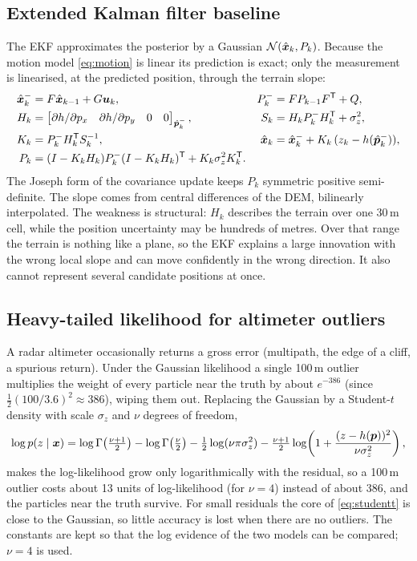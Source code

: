 \subsection{Extended Kalman filter baseline}\label{sec:ekf}
The EKF approximates the posterior by a Gaussian $\mathcal{N}(\hat{\bm{x}}_k, P_k)$. Because the motion model
\eqref{eq:motion} is linear its prediction is exact; only the measurement is linearised, at the
predicted position, through the terrain slope:
\begin{align}
  \hat{\bm{x}}_k^- &= F\hat{\bm{x}}_{k-1} + G\bm{u}_k, & P_k^- &= F P_{k-1} F^{\mathsf{T}} + Q,\\
  H_k &= \begin{bmatrix} \partial h/\partial p_x & \partial h/\partial p_y & 0 & 0\end{bmatrix}_{\hat{\bm{p}}_k^-},
  & S_k &= H_k P_k^- H_k^{\mathsf{T}} + \sigma_z^2,\\
  K_k &= P_k^- H_k^{\mathsf{T}} S_k^{-1}, & \hat{\bm{x}}_k &= \hat{\bm{x}}_k^- + K_k\,(z_k - h(\hat{\bm{p}}_k^-)),\\
  P_k &= (I - K_k H_k) P_k^- (I - K_k H_k)^{\mathsf{T}} + K_k \sigma_z^2 K_k^{\mathsf{T}}. &&
\end{align}
The Joseph form of the covariance update keeps $P_k$ symmetric positive semi-definite. The
slope comes from central differences of the DEM, bilinearly interpolated. The weakness is
structural: $H_k$ describes the terrain over one 30\,m cell, while the position uncertainty may
be hundreds of metres. Over that range the terrain is nothing like a plane, so the EKF explains a
large innovation with the wrong local slope and can move confidently in the wrong direction.
It also cannot represent several candidate positions at once.

\subsection{Heavy-tailed likelihood for altimeter outliers}\label{sec:studentt}
A radar altimeter occasionally returns a gross error (multipath, the edge of a cliff, a
spurious return). Under the Gaussian likelihood a single 100\,m outlier multiplies the weight
of every particle near the truth by about $e^{-386}$ (since $\tfrac12(100/3.6)^2 \approx 386$),
wiping them out. Replacing the Gaussian
by a Student-$t$ density with scale $\sigma_z$ and $\nu$ degrees of freedom,
\begin{equation}
  \log p(z \mid \bm{x}) = \log\Gamma\!\left(\tfrac{\nu+1}{2}\right) - \log\Gamma\!\left(\tfrac{\nu}{2}\right)
  - \tfrac12 \log(\nu\pi\sigma_z^2)
  - \tfrac{\nu+1}{2}\log\!\left(1 + \frac{(z - h(\bm{p}))^2}{\nu\sigma_z^2}\right),
  \label{eq:studentt}
\end{equation}
makes the log-likelihood grow only logarithmically with the residual, so a 100\,m outlier costs
about 13 units of log-likelihood (for $\nu = 4$) instead of about 386, and the particles near the
truth survive. For small residuals
the core of \eqref{eq:studentt} is close to the Gaussian, so little accuracy is lost when there
are no outliers. The constants are kept so that the log evidence of the two models can be
compared; $\nu = 4$ is used.

